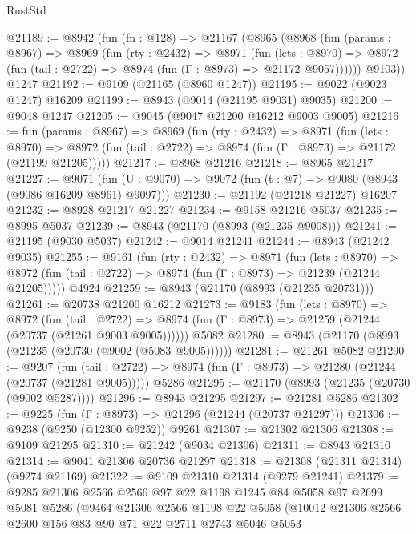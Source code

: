 \begin{lexlean}{RustStd}
\begin{coremodule}
@21189 := @8942
    (fun (fn : @128) =>
    @21167
      (@8965
        (@8968
          (fun (params : @8967) =>
          @8969
            (fun (rty : @2432) =>
            @8971
              (fun (lets : @8970) =>
              @8972 (fun (tail : @2722) => @8974 (fun (Γ : @8973) => @21172 @9057))))))
        @9103))
    @1247
@21192 := @9109 (@21165 (@8960 @1247))
@21195 := @9022 (@9023 @1247) @16209
@21199 := @8943 (@9014 (@21195 @9031) @9035)
@21200 := @9048 @1247
@21205 := @9045 (@9047 @21200 @16212 @9003 @9005)
@21216 := fun (params : @8967) =>
  @8969
    (fun (rty : @2432) =>
    @8971
      (fun (lets : @8970) =>
      @8972 (fun (tail : @2722) => @8974 (fun (Γ : @8973) => @21172 (@21199 @21205)))))
@21217 := @8968 @21216
@21218 := @8965 @21217
@21227 := @9071
    (fun (U : @9070) => @9072 (fun (t : @7) => @9080 (@8943 (@9086 @16209 @8961) @9097)))
@21230 := @21192 (@21218 @21227) @16207
@21232 := @8928 @21217 @21227
@21234 := @9158 @21216 @5037
@21235 := @8995 @5037
@21239 := @8943 (@21170 (@8993 (@21235 @9008)))
@21241 := @21195 (@9030 @5037)
@21242 := @9014 @21241
@21244 := @8943 (@21242 @9035)
@21255 := @9161
    (fun (rty : @2432) =>
    @8971
      (fun (lets : @8970) =>
      @8972 (fun (tail : @2722) => @8974 (fun (Γ : @8973) => @21239 (@21244 @21205)))))
    @4924
@21259 := @8943 (@21170 (@8993 (@21235 @20731)))
@21261 := @20738 @21200 @16212
@21273 := @9183
    (fun (lets : @8970) =>
    @8972
      (fun (tail : @2722) =>
      @8974 (fun (Γ : @8973) => @21259 (@21244 (@20737 (@21261 @9003 @9005))))))
    @5082
@21280 := @8943 (@21170 (@8993 (@21235 (@20730 (@9002 (@5083 @9005))))))
@21281 := @21261 @5082
@21290 := @9207
    (fun (tail : @2722) => @8974 (fun (Γ : @8973) => @21280 (@21244 (@20737 (@21281 @9005)))))
    @5286
@21295 := @21170 (@8993 (@21235 (@20730 (@9002 @5287))))
@21296 := @8943 @21295
@21297 := @21281 @5286
@21302 := @9225 (fun (Γ : @8973) => @21296 (@21244 (@20737 @21297)))
@21306 := @9238 (@9250 (@12300 @9252)) @9261
@21307 := @21302 @21306
@21308 := @9109 @21295
@21310 := @21242 (@9034 @21306)
@21311 := @8943 @21310
@21314 := @9041 @21306 @20736 @21297
@21318 := @21308 (@21311 @21314) (@9274 @21169)
@21322 := @9109 @21310 @21314 (@9279 @21241)
@21379 := @9285
    @21306
    @2566
    @2566
    @97
    @22
    @1198
    @1245
    @84
    @5058
    @97
    @2699
    @5081
    @5286
    (@9464
      @21306
      @2566
      @1198
      @22
      @5058
      (@10012
        @21306
        @2566
        @2600
        @156
        @83
        @90
        @71
        @22
        @2711
        @2743
        @5046
        @5053

\end{coremodule}
\end{lexlean}
